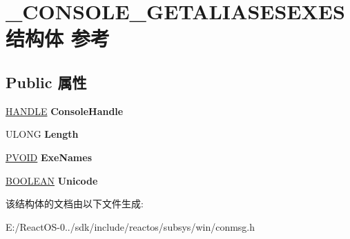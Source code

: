 \hypertarget{struct___c_o_n_s_o_l_e___g_e_t_a_l_i_a_s_e_s_e_x_e_s}{}\section{\+\_\+\+C\+O\+N\+S\+O\+L\+E\+\_\+\+G\+E\+T\+A\+L\+I\+A\+S\+E\+S\+E\+X\+E\+S结构体 参考}
\label{struct___c_o_n_s_o_l_e___g_e_t_a_l_i_a_s_e_s_e_x_e_s}
\subsection*{Public 属性}
\begin{DoxyCompactItemize}
\item 
\mbox{\label{struct___c_o_n_s_o_l_e___g_e_t_a_l_i_a_s_e_s_e_x_e_s_a2c5d3d4fee01e753ad1b8222802c9972}} 
\hyperlink{interfacevoid}{H\+A\+N\+D\+LE} {\bfseries Console\+Handle}
\item 
\mbox{\label{struct___c_o_n_s_o_l_e___g_e_t_a_l_i_a_s_e_s_e_x_e_s_a291fe2fad8d2640c41763fc2f6a971f5}} 
U\+L\+O\+NG {\bfseries Length}
\item 
\mbox{\label{struct___c_o_n_s_o_l_e___g_e_t_a_l_i_a_s_e_s_e_x_e_s_a52b5a46195909e28314e0ee308ce9aa7}} 
\hyperlink{interfacevoid}{P\+V\+O\+ID} {\bfseries Exe\+Names}
\item 
\mbox{\label{struct___c_o_n_s_o_l_e___g_e_t_a_l_i_a_s_e_s_e_x_e_s_a4471b8bcbeb0a19f54d703ec0d88101c}} 
\hyperlink{_processor_bind_8h_a112e3146cb38b6ee95e64d85842e380a}{B\+O\+O\+L\+E\+AN} {\bfseries Unicode}
\end{DoxyCompactItemize}


该结构体的文档由以下文件生成\+:\begin{DoxyCompactItemize}
\item 
E\+:/\+React\+O\+S-\/0../sdk/include/reactos/subsys/win/conmsg.\+h\end{DoxyCompactItemize}
